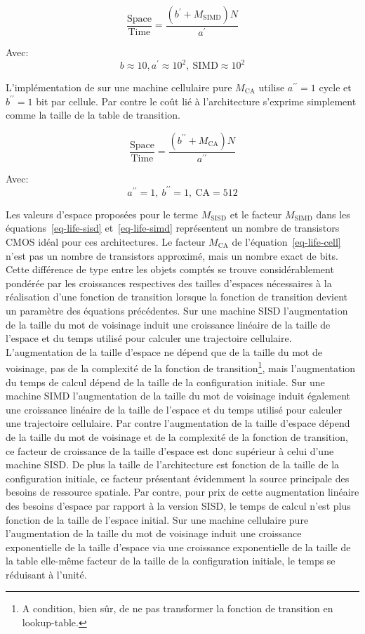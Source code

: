 \begin{equation}
  \frac{\text{Space}}{\text{Time}} = \frac{(b^{\prime}+M_{\text{SIMD}})N}{a^{\prime}}
  \label{eq-life-simd}
\end{equation}

Avec:\[b \approx 10,a^{\prime} \approx 10^2,~\text{SIMD} \approx 10^2\]

L'implémentation de  sur une machine cellulaire pure $M_{\text{CA}}$
utilise $a^{\prime\prime} = 1$ cycle et  $b^{\prime\prime} = 1$ bit par
cellule. %
Par contre le coût lié à l'architecture s'exprime simplement comme la
taille de la table de transition. %

\begin{equation}
  \frac{\text{Space}}{\text{Time}} =
  \frac{(b^{\prime\prime}+M_{\text{CA}})N}{a^{\prime\prime}}
  \label{eq-life-cell}
\end{equation}

Avec:\[a^{\prime\prime} = 1,~b^{\prime\prime} = 1,~\text{CA} = 512\]

Les valeurs d'espace proposées pour le terme $M_{\text{SISD}}$ et le
facteur $M_{\text{SIMD}}$ dans les équations~\ref{eq-life-sisd}
et~\ref{eq-life-simd} représentent un nombre de transistors CMOS idéal
pour ces architectures. %
Le facteur $M_{\text{CA}}$ de l'équation~\ref{eq-life-cell} n'est pas
un nombre de transistors approximé, mais un nombre exact de bits. %
Cette différence de type entre les objets comptés se trouve
considérablement pondérée par les croissances respectives des tailles
d'espaces nécessaires à la réalisation d'une fonction de transition
lorsque la fonction de transition devient un paramètre des équations
précédentes. %
Sur une machine SISD l'augmentation de la taille du mot de voisinage
induit une croissance linéaire de la taille de l'espace et du temps
utilisé pour calculer une trajectoire cellulaire. %
L'augmentation de la taille d'espace ne dépend que de la taille du mot
de voisinage, pas de la complexité de la fonction de
transition\footnote{%
  A condition, bien sûr, de ne pas transformer la fonction de
  transition en lookup-table.}, %
mais l'augmentation du temps de calcul dépend de la taille de la
configuration initiale. %
Sur une machine SIMD l'augmentation de la taille du mot de voisinage
induit également une croissance linéaire de la taille de l'espace et
du temps utilisé pour calculer une trajectoire cellulaire. %
Par contre l'augmentation de la taille d'espace dépend de la taille
du mot de voisinage et de la complexité de la fonction de transition,
ce facteur de croissance de la taille d'espace est donc supérieur à
celui d'une machine SISD\@. %
De plus la taille de l'architecture est fonction de la taille de la
configuration initiale, ce facteur présentant évidemment la source
principale des besoins de ressource spatiale. %
Par contre, pour prix de cette augmentation linéaire des besoins
d'espace par rapport à la version SISD, le temps de calcul n'est plus
fonction de la taille de l'espace initial. %
Sur une machine cellulaire pure l'augmentation de la taille du mot de
voisinage induit une croissance exponentielle de la taille d'espace
via une croissance exponentielle de la taille de la table elle-même
facteur de la taille de la configuration initiale, le temps se
réduisant à l'unité. %

